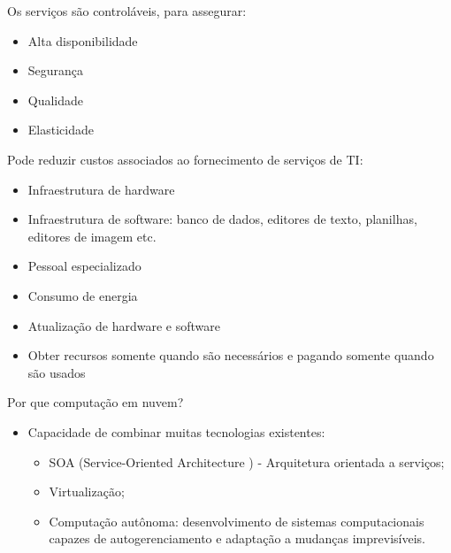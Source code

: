 \documentclass{beamer}
\begin{document}
\begin{frame}[fragile]{Os serviços são controláveis, para assegurar:}\justifying
      \begin{itemize}
            \item Alta disponibilidade
            \item Segurança
            \item Qualidade
            \item Elasticidade
      \end{itemize}
\end{frame}
\begin{frame}[fragile]{Pode reduzir custos associados ao fornecimento de serviços de TI:}\justifying
      \begin{itemize}
            \item Infraestrutura de hardware
            \item Infraestrutura de software:  banco de dados, editores de texto, planilhas, editores de imagem etc.
            \item Pessoal especializado
            \item Consumo de energia
            \item Atualização de hardware e software
            \item Obter recursos somente quando são necessários e pagando somente quando são usados
      \end{itemize}
\end{frame}
\begin{frame}[fragile]{Por que computação em nuvem?}\justifying
      \begin{itemize}
            \item Capacidade de combinar muitas tecnologias existentes:
            \begin{itemize}
                  \item SOA (Service-Oriented Architecture ) - Arquitetura orientada a serviços;
                  \item Virtualização;
                  \item Computação autônoma: desenvolvimento de sistemas computacionais capazes de autogerenciamento e adaptação a mudanças imprevisíveis.
            \end{itemize}
      \end{itemize}
\end{frame}
\end{document}
